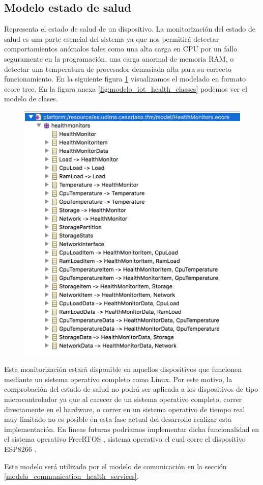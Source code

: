 \subsection{Modelo estado de salud}
\label{modelo_health}

Representa el estado de salud de un dispositivo. La monitorización del estado de salud es una parte esencial del sistema ya que nos permitirá detectar comportamientos anómalos tales como una alta carga en CPU por un fallo seguramente en la programación, una carga anormal de memoria RAM, o detectar una temperatura de procesador demasiada alta para su correcto funcionamiento.
En la siguiente figura \ref{fig:modelo_iot_health_ecore} visualizamos el modelado en formato \gls{ecore} tree. En la figura anexa \ref{fig:modelo_iot_health_classes} podemos ver el modelo de clases.

\begin{figure}
	\centering
    \includegraphics[scale=0.5]{images/emf_capturas/health_ecore.png}
    \label{fig:modelo_iot_health_ecore}
\end{figure}

Esta monitorización estará disponible en aquellos dispositivos que funcionen mediante un sistema operativo completo como Linux. Por este motivo, la comprobación del estado de salud no podrá ser aplicada a los dispositivos de tipo microcontrolador ya que al carecer de un sistema operativo completo, correr directamente en el hardware, o correr en un sistema operativo de tiempo real muy limitado no es posible en esta fase actual del desarrollo realizar esta implementación. En líneas futuras podríamos implementar dicha funcionalidad en el sistema operativo FreeRTOS \cite{freertos}, sistema operativo el cual corre el dispositivo ESP8266 \cite{esp8266}.

Este modelo será utilizado por el modelo de comunicación en la sección \ref{modelo_communication_health_services}.
